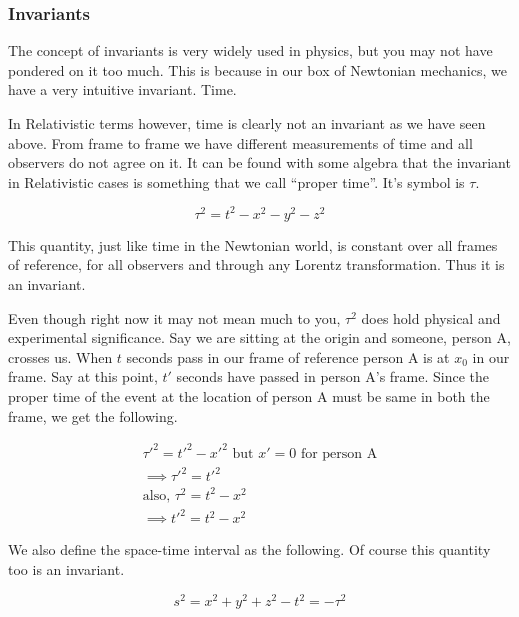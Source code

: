 \documentclass[12pt]{article}
\numberwithin{equation}{section}
\theoremstyle{plain}
\theoremstyle{definition}
\begin{document}
\subsubsection*{Invariants}

The concept of invariants is very widely used in physics, but you may not have pondered on it too much. This is because in our box of Newtonian mechanics, we have a very intuitive invariant. Time. 

In Relativistic terms however, time is clearly not an invariant as we have seen above. From frame to frame we have different measurements of time and all observers do not agree on it. It can be found with some algebra that the invariant in Relativistic cases is something that we call ``proper time''. It's symbol is $\tau$.

\begin{equation}
    \tau^2 = t^2 - x^2 - y^2 - z^2
    \label{eq:propertime}
\end{equation}

This quantity, just like time in the Newtonian world, is constant over all frames of reference, for all observers and through any Lorentz transformation. Thus it is an invariant. 

Even though right now it may not mean much to you, $\tau^2$ does hold physical and experimental significance. Say we are sitting at the origin and someone, person A, crosses us. When $t$ seconds pass in our frame of reference person A is at $x_0$ in our frame. Say at this point, $t'$ seconds have passed in person A's frame. Since the proper time of the event at the location of person A must be same in both the frame, we get the following.

\begin{gather}
    \tau'^2 = t'^2 - x'^2 \text{ but } x'=0 \text{ for person A} \\
    \implies \tau'^2 = t'^2\\
    \text{also, } \tau^2 = t^2 - x^2\\
    \implies t'^2 = t^2 - x^2
    \label{eq:proper-time-significance}
\end{gather}

We also define the space-time interval as the following. Of course this quantity too is an invariant.

\begin{equation}
    s^2 = x^2 + y^2 + z^2 - t^2 = - \tau^2
    \label{eq:spacetime-interval}
\end{equation}
\end{document}

